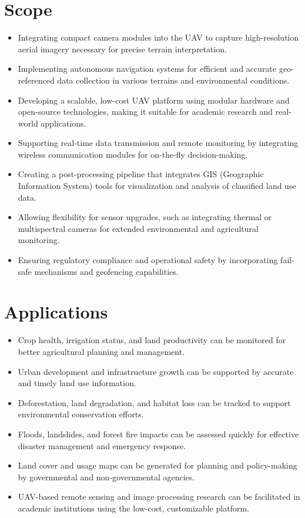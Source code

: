 \section{Scope}
   
\begin{itemize}
    
    \item Integrating compact camera modules into the UAV to capture high-resolution aerial imagery necessary for precise terrain interpretation.
    
    \item Implementing autonomous navigation systems for efficient and accurate geo-referenced data collection in various terrains and environmental conditions.
    \item Developing a scalable, low-cost UAV platform using modular hardware and open-source technologies, making it suitable for academic research and real-world applications.
    \item Supporting real-time data transmission and remote monitoring by integrating wireless communication modules for on-the-fly decision-making.
    \item Creating a post-processing pipeline that integrates GIS (Geographic Information System) tools for visualization and analysis of classified land use data.
    \item Allowing flexibility for sensor upgrades, such as integrating thermal or multispectral cameras for extended environmental and agricultural monitoring.
    \item Ensuring regulatory compliance and operational safety by incorporating fail-safe mechanisms and geofencing capabilities.
\end{itemize}


\section{Applications}


\begin{itemize}
    \item Crop health, irrigation status, and land productivity can be monitored for better agricultural planning and management.
    \item Urban development and infrastructure growth can be supported by accurate and timely land use information.
    \item Deforestation, land degradation, and habitat loss can be tracked to support environmental conservation efforts.
    \item Floods, landslides, and forest fire impacts can be assessed quickly for effective disaster management and emergency response.
    \item Land cover and usage maps can be generated for planning and policy-making by governmental and non-governmental agencies.
    \item UAV-based remote sensing and image processing research can be facilitated in academic institutions using the low-cost, customizable platform.
\end{itemize}
